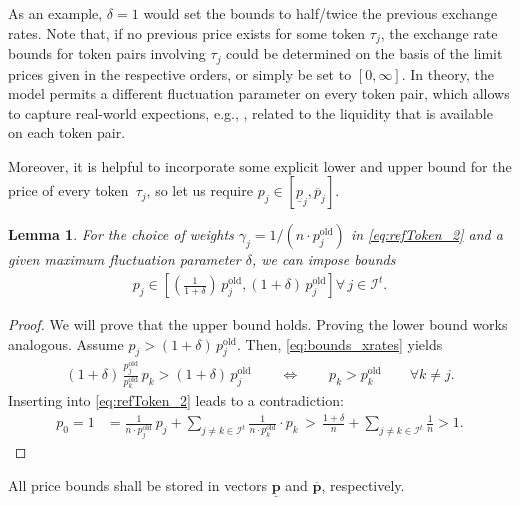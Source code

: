 \documentclass[11pt,parskip=full]{scrartcl}%
\newcommand*{\eg}{e.g., }
\newcommand*{\itokens}{\mathcal{I}^t}       %
\newtheorem{lemma}[theorem]{Lemma}
\begin{document}
As an example, $ \delta = 1 $ would set the bounds to half/twice the previous exchange rates.
Note that, if no previous price exists for some token $ \tau_j $, the exchange rate bounds for
token pairs involving $ \tau_j $ could be determined on the basis of the limit prices given in
the respective orders, or simply be set to $ [0,\infty] $.
In theory, the model permits a different fluctuation parameter on every token pair, which allows to
capture real-world expections, \eg, related to the liquidity that is available on each token pair. 

Moreover, it is helpful to incorporate some explicit lower and upper bound for the price of every
token~$ \tau_j $, so let us require $ p_j \in [\underline{p}_j,\overline{p}_j] $.

\begin{lemma}
  For the choice of weights $ \gamma_j = 1 / (n \cdot p_j^\mathrm{old}) $ in \eqref{eq:refToken_2}
  and a given maximum fluctuation parameter $ \delta $, we can impose bounds
  \begin{align}
    p_j \in \left[ \left(\frac{1}{1+\delta}\right) \, p^\mathrm{old}_j, (1+\delta) \,
  p^
  \mathrm{old}_j \right] \forall \, j \in \itokens.
  \end{align}
\end{lemma}
\vspace{-.5cm}
\begin{proof}
  We will prove that the upper bound holds.
  Proving the lower bound works analogous.
  Assume $ p_j > (1+\delta) \, p_j^\mathrm{old} $.
  Then, \eqref{eq:bounds_xrates} yields
  \begin{align*}
    (1+\delta) \, \frac{p^\mathrm{old}_j}{p^\mathrm{old}_k} \, p_k > (1+\delta) \, p_j^\mathrm{old}
    \qquad \Leftrightarrow \qquad p_k > p_k^\mathrm{old}
    \qquad \forall k \neq j.
  \end{align*}
  Inserting into \eqref{eq:refToken_2} leads to a contradiction:
  \begin{align*}
    p_0 = 1
    &= \frac{1}{n \cdot p_j^\mathrm{old}} \, p_j + \sum\limits_{j \neq k \in \itokens}
      \frac{1}{n \cdot p_k^\mathrm{old}} \cdot p_k
    \, > \, \frac{1+\delta}{n} + \sum\limits_{j \neq k \in \itokens} \frac{1}{n} > 1.
  \end{align*}
\end{proof}
\vspace{-.4cm}

All price bounds shall be stored in vectors $\underline{\mathbf{p}}$ and $\overline{\mathbf{p}}$,
respectively.
\end{document}
